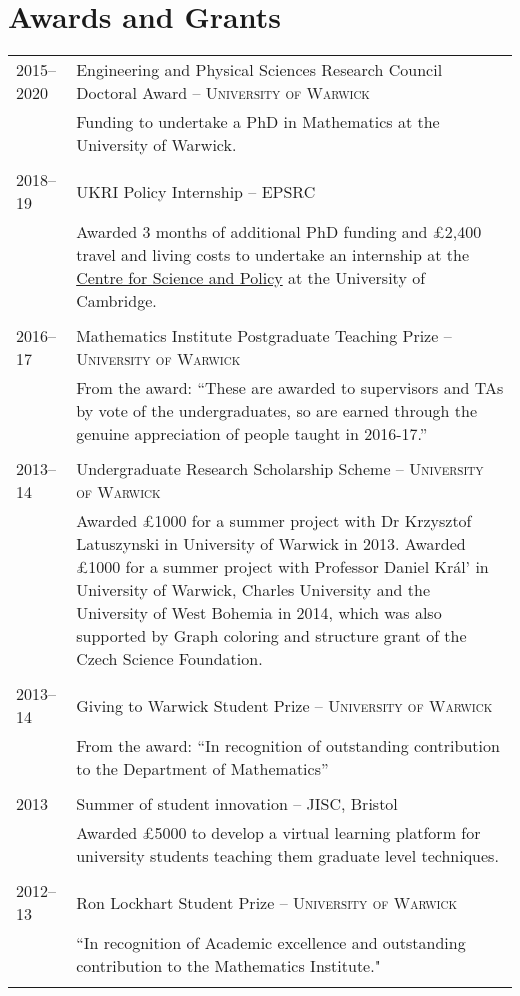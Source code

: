 \documentclass[a4paper,10pt]{article}
\begin{document}
\section{Awards and Grants}
\begin{tabular}{p{2.25cm}|p{15cm}}
	\textsc{2015--2020}& Engineering and Physical Sciences Research Council Doctoral Award -- \textsc{University of Warwick}\\&\footnotesize{Funding to undertake a PhD in Mathematics at the University of Warwick.}\\\multicolumn{2}{c}{} \\
	\textsc{2018--19}& UKRI Policy Internship -- \textsc{EPSRC}\\&\footnotesize{Awarded 3 months of additional PhD funding and £2,400 travel and living costs to undertake an internship at the \href{https://www.csap.cam.ac.uk/}{Centre for Science and Policy} at the University of Cambridge.}\\\multicolumn{2}{c}{} \\
	\textsc{2016--17}& Mathematics Institute Postgraduate Teaching Prize -- \textsc{University of Warwick}\\&\footnotesize{From the award: ``These are awarded to supervisors and TAs by vote of the undergraduates, so are earned through the genuine appreciation of people taught in 2016-17.”}\\\multicolumn{2}{c}{} \\
	\textsc{2013--14}& Undergraduate Research Scholarship Scheme -- \textsc{University of Warwick}\\&\footnotesize{Awarded £1000 for a summer project with Dr Krzysztof Latuszynski in University of Warwick in 2013. Awarded £1000 for a summer project with Professor Daniel Král' in University of Warwick, Charles University and the University of West Bohemia in 2014, which was also supported by Graph coloring and structure grant of the Czech Science Foundation.}\\\multicolumn{2}{c}{} \\
	\textsc{2013--14}& Giving to Warwick Student Prize -- \textsc{University of Warwick}\\&\footnotesize{From the award: ``In recognition of outstanding contribution to the Department of Mathematics”}\\\multicolumn{2}{c}{} \\
	\textsc{2013}& Summer of student innovation -- \textsc{JISC}, Bristol\\&\footnotesize{Awarded £5000 to develop a virtual learning platform for university students teaching them graduate level techniques.}\\\multicolumn{2}{c}{} \\
	\textsc{2012--13}& Ron Lockhart Student Prize -- \textsc{University of Warwick}\\&\footnotesize{``In recognition of Academic excellence and outstanding contribution to the Mathematics Institute."}\\\multicolumn{2}{c}{} \\
\end{tabular}
\end{document}
